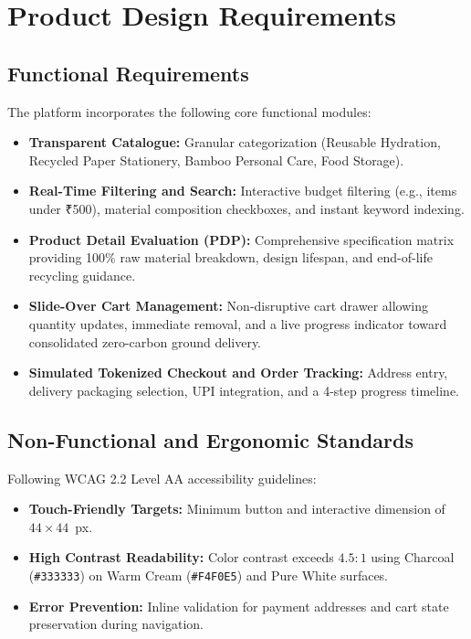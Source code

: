 \documentclass[11pt,a4paper]{article}
\begin{document}
\section{Product Design Requirements}

\subsection{Functional Requirements}
The platform incorporates the following core functional modules:
\begin{itemize}
    \item \textbf{Transparent Catalogue:} Granular categorization (Reusable Hydration, Recycled Paper Stationery, Bamboo Personal Care, Food Storage).
    \item \textbf{Real-Time Filtering and Search:} Interactive budget filtering (e.g., items under ₹500), material composition checkboxes, and instant keyword indexing.
    \item \textbf{Product Detail Evaluation (PDP):} Comprehensive specification matrix providing 100\% raw material breakdown, design lifespan, and end-of-life recycling guidance.
    \item \textbf{Slide-Over Cart Management:} Non-disruptive cart drawer allowing quantity updates, immediate removal, and a live progress indicator toward consolidated zero-carbon ground delivery.
    \item \textbf{Simulated Tokenized Checkout and Order Tracking:} Address entry, delivery packaging selection, UPI integration, and a 4-step progress timeline.
\end{itemize}

\subsection{Non-Functional and Ergonomic Standards}
Following WCAG 2.2 Level AA accessibility guidelines:
\begin{itemize}
    \item \textbf{Touch-Friendly Targets:} Minimum button and interactive dimension of $44 \times 44$~px.
    \item \textbf{High Contrast Readability:} Color contrast exceeds $4.5:1$ using Charcoal (\texttt{\#333333}) on Warm Cream (\texttt{\#F4F0E5}) and Pure White surfaces.
    \item \textbf{Error Prevention:} Inline validation for payment addresses and cart state preservation during navigation.
\end{itemize}
\end{document}
